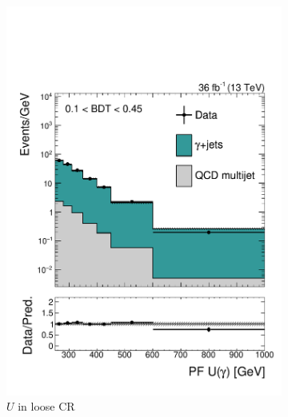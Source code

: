 \begin{figure}[]
    \begin{center}
        \begin{subfigure}[t]{0.32\textwidth}
            \includegraphics[width=\textwidth]{figures/monotop/prefit/photon_loose_pfUAmag_logy.pdf}
            \caption{$U$ in loose CR}
        \end{subfigure}
        \begin{subfigure}[t]{0.32\textwidth}

\end{subfigure}
\end{center}
\end{figure}
